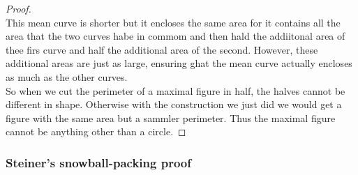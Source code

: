 \documentclass[12pt, a4paper, titlepage]{article}
\begin{document}
\begin{proof}
\\
This mean curve is shorter but it encloses the same area for it contains all the area that the two curves habe in commom and then hald the addiitonal area of thee firs curve and half the additional area of the second. However, these additional areas are just as large, ensuring ghat the mean curve actually encloses as much as the other curves.\\
So when we cut the perimeter of a maximal figure in half, the halves cannot be different in shape. Otherwise with the construction we just did we would get a figure with the same area but a sammler perimeter. Thus the maximal figure cannot be anything other than a circle.
\end{proof}

\subsubsection*{Steiner's snowball-packing proof}
\end{document}
